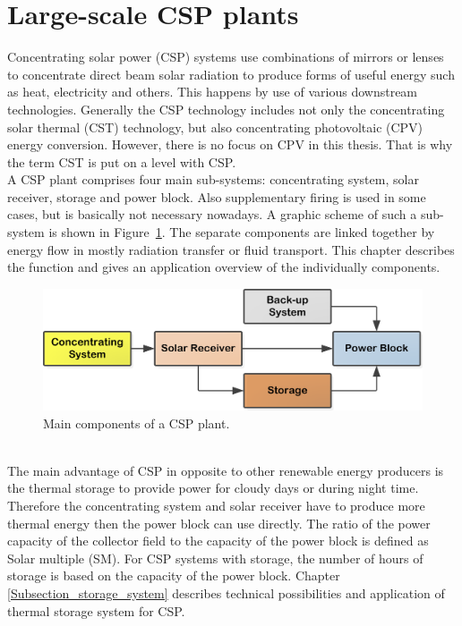 \documentclass[Master,MEE,english]{twbook}%
\begin{document}
\section{Large-scale CSP plants}\label{Large scale concentrated solar power (CSP) plants}
Concentrating solar power (CSP) systems use combinations of mirrors or lenses to concentrate direct beam solar radiation to produce forms of useful energy such as heat, electricity and others. This happens by use of various downstream technologies. Generally the CSP technology includes not only the concentrating solar thermal (CST) technology, but also concentrating photovoltaic (CPV) energy conversion. However, there is no focus on CPV in this thesis. That is why the term CST is put on a level with CSP.\\
A CSP plant comprises four main sub-systems: concentrating system, solar receiver, storage and power block. Also supplementary firing is used in some cases, but is basically not necessary nowadays. A graphic scheme of such a sub-system is shown in Figure~\ref{MainComp}. The separate components are linked together by energy flow in mostly radiation transfer or fluid transport. This chapter describes the function and gives an application overview of the individually components. 
\begin{figure}[!h] 
\centering
\includegraphics[width=0.85\linewidth]{FIG/MainComp}
\caption[Main components of a CSP plant.]{Main components of a CSP plant.}\label{MainComp}
\end{figure}
\\
The main advantage of CSP in opposite to other renewable energy producers is the thermal storage to provide power for cloudy days or during night time. Therefore the concentrating system and solar receiver have to produce more thermal energy then the power block can use directly. The ratio of the power capacity of the collector field to the capacity of the power block is defined as Solar multiple (SM). For CSP systems with storage, the number of hours of storage is based on the capacity of the power block. Chapter \ref{Subsection_storage_system} describes technical possibilities and application of thermal storage system for CSP.\\
\end{document}
